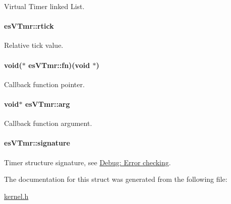 Virtual Timer linked List. 

\hypertarget{structesVTmr_a4bbde49720b6aa0cc97e932ccb0383ea}{
\paragraph[{rtick}]{ es\-V\-Tmr\-::rtick}}\label{structesVTmr_a4bbde49720b6aa0cc97e932ccb0383ea}


Relative tick value. 

\hypertarget{structesVTmr_a17137ebfaf21de24d136b7d9b1390ddc}{
\paragraph[{fn}]{\setlength{\rightskip}{0pt plus 5cm}void($\ast$  es\-V\-Tmr\-::fn)(void $\ast$)}}\label{structesVTmr_a17137ebfaf21de24d136b7d9b1390ddc}


Callback function pointer. 

\hypertarget{structesVTmr_a4bd88651471b32f1fe71b4cec22756c0}{
\paragraph[{arg}]{\setlength{\rightskip}{0pt plus 5cm}void$\ast$ es\-V\-Tmr\-::arg}}\label{structesVTmr_a4bd88651471b32f1fe71b4cec22756c0}


Callback function argument. 

\hypertarget{structesVTmr_a8a620761f277b95ead5fc6f52c898daf}{
\paragraph[{signature}]{ es\-V\-Tmr\-::signature}}\label{structesVTmr_a8a620761f277b95ead5fc6f52c898daf}


Timer structure signature, see \hyperlink{errors}{Debug\-: Error checking}. 



The documentation for this struct was generated from the following file\-:\begin{DoxyCompactItemize}
\item 
\hyperlink{kernel_8h}{kernel.\-h}\end{DoxyCompactItemize}

